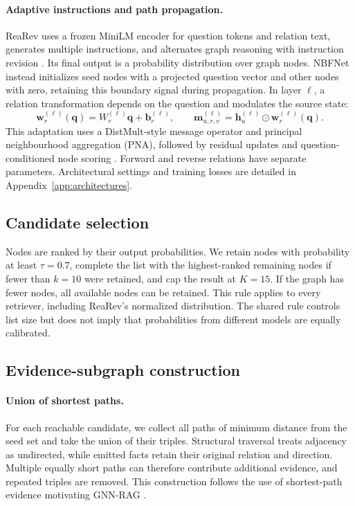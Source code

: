 \documentclass[10pt]{article}
\begin{document}
\paragraph{Adaptive instructions and path propagation.}
ReaRev uses a frozen MiniLM encoder for question tokens and relation text, generates multiple instructions, and alternates graph reasoning with instruction revision \citep{mavromatis2022rearev,wang2020minilm}. Its final output is a probability distribution over graph nodes. NBFNet instead initializes seed nodes with a projected question vector and other nodes with zero, retaining this boundary signal during propagation. In layer $\ell$, a relation transformation depends on the question and modulates the source state:
\begin{equation}
 \mathbf w_r^{(\ell)}(\mathbf q)=W_r^{(\ell)}\mathbf q+\mathbf b_r^{(\ell)},
 \qquad
 \mathbf m_{u,r,v}^{(\ell)}=\mathbf h_u^{(\ell)}\odot\mathbf w_r^{(\ell)}(\mathbf q).
 \label{eq:nbfnet}
\end{equation}
This adaptation uses a DistMult-style message operator and principal neighbourhood aggregation (PNA), followed by residual updates and question-conditioned node scoring \citep{yang2015distmult,corso2020pna}. Forward and reverse relations have separate parameters. Architectural settings and training losses are detailed in Appendix~\ref{app:architectures}.

\subsection{Candidate selection}
\label{sec:candidates}

Nodes are ranked by their output probabilities. We retain nodes with probability at least $\tau=0.7$, complete the list with the highest-ranked remaining nodes if fewer than $k=10$ were retained, and cap the result at $K=15$. If the graph has fewer nodes, all available nodes can be retained. This rule applies to every retriever, including ReaRev's normalized distribution. The shared rule controls list size but does not imply that probabilities from different models are equally calibrated.

\subsection{Evidence-subgraph construction}
\label{sec:evidence}

\paragraph{Union of shortest paths.}
For each reachable candidate, we collect all paths of minimum distance from the seed set and take the union of their triples. Structural traversal treats adjacency as undirected, while emitted facts retain their original relation and direction. Multiple equally short paths can therefore contribute additional evidence, and repeated triples are removed. This construction follows the use of shortest-path evidence motivating GNN-RAG \citep{mavromatis2025gnnrag}.
\end{document}
